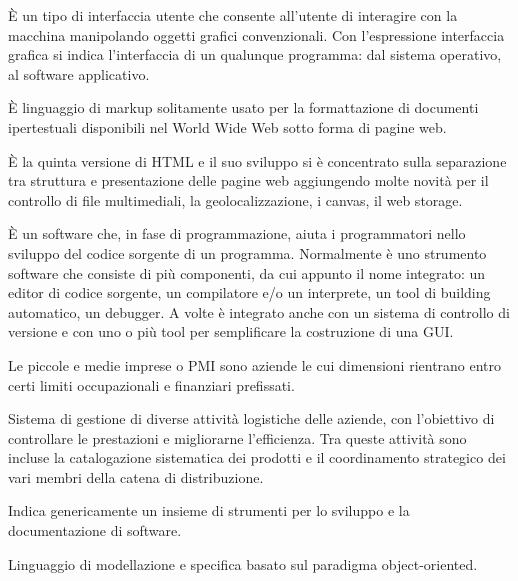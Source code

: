 \begin{acronym}[HTML5]
	{\small È un tipo di interfaccia utente che consente all'utente di interagire con la macchina manipolando oggetti grafici convenzionali. Con l'espressione interfaccia grafica si indica l'interfaccia di un qualunque programma: dal sistema operativo, al software applicativo. \par}
	
	
	{\small È linguaggio di markup solitamente usato per la formattazione di documenti ipertestuali disponibili nel World Wide Web sotto forma di pagine web. \par}
	
	
	{\small È la quinta versione di HTML e il suo sviluppo si è concentrato sulla separazione tra struttura e presentazione delle pagine web aggiungendo molte novità per il controllo di file multimediali, la geolocalizzazione, i canvas, il web storage. \par}

	
	{\small È un software che, in fase di programmazione, aiuta i programmatori nello sviluppo del codice sorgente di un programma. Normalmente è uno strumento software che consiste di più componenti, da cui appunto il nome integrato: un editor di codice sorgente, un compilatore e/o un interprete, un tool di building automatico, un debugger. A volte è integrato anche con un sistema di controllo di versione e con uno o più tool per semplificare la costruzione di una GUI. \par}
	
	
	{\small Le piccole e medie imprese o PMI sono aziende le cui dimensioni rientrano entro certi limiti occupazionali e finanziari prefissati. \par}

	
	{\small Sistema di gestione di diverse attività logistiche delle aziende, con l'obiettivo di controllare le prestazioni e migliorarne l'efficienza. Tra queste attività sono incluse la catalogazione sistematica dei prodotti e il coordinamento strategico dei vari membri della catena di distribuzione. \par}

	
	{\small Indica genericamente un insieme di strumenti per lo sviluppo e la documentazione di software. \par}

	
	{\small  Linguaggio di modellazione e specifica basato sul paradigma object-oriented. \par}
\end{acronym}
